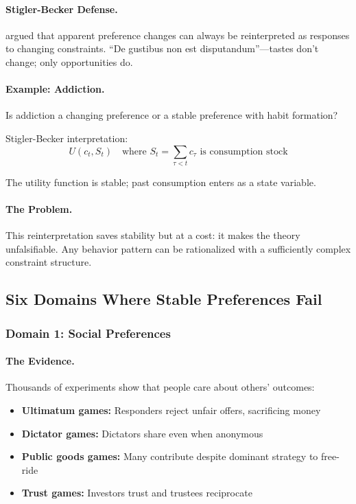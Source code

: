 \paragraph{Stigler-Becker Defense.}
\citet{stiglerbecker1977} argued that apparent preference changes can always
be reinterpreted as responses to changing constraints.
``De gustibus non est disputandum''---tastes don't change; only opportunities do.

\paragraph{Example: Addiction.}
Is addiction a changing preference or a stable preference with habit formation?

Stigler-Becker interpretation:
\begin{equation}
  U(c_t, S_t) \quad \text{where } S_t = \sum_{\tau < t} c_\tau \text{ is consumption stock}
\end{equation}

The utility function is stable; past consumption enters as a state variable.

\paragraph{The Problem.}
This reinterpretation saves stability but at a cost:
it makes the theory unfalsifiable.
Any behavior pattern can be rationalized with a sufficiently complex constraint structure.

\subsection{Six Domains Where Stable Preferences Fail}

\subsubsection{Domain 1: Social Preferences}

\paragraph{The Evidence.}
Thousands of experiments show that people care about others' outcomes:
\begin{itemize}
  \item \textbf{Ultimatum games:} Responders reject unfair offers, sacrificing money \citep{guth1982}
  \item \textbf{Dictator games:} Dictators share even when anonymous
  \item \textbf{Public goods games:} Many contribute despite dominant strategy to free-ride \citep{andreoni1988}
  \item \textbf{Trust games:} Investors trust and trustees reciprocate \citep{berg1995}
\end{itemize}

